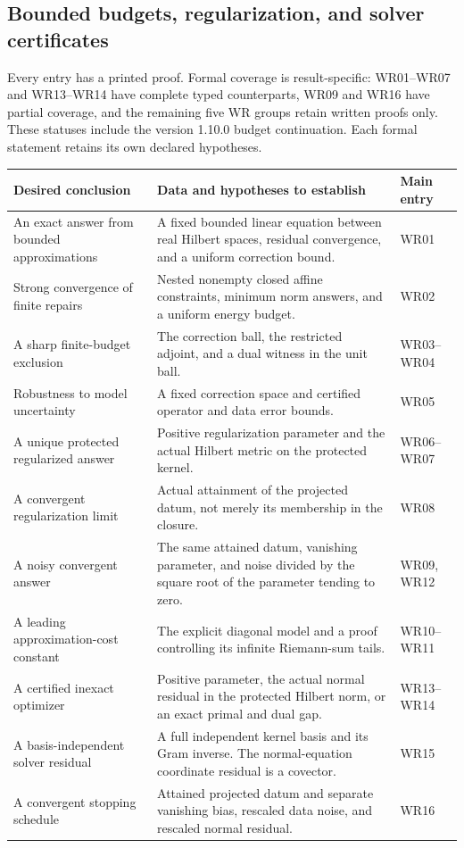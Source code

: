 \subsection{Bounded budgets, regularization, and solver certificates}
Every entry has a printed proof. Formal coverage is result-specific: WR01--WR07 and WR13--WR14 have complete typed counterparts, WR09 and WR16 have partial coverage, and the remaining five WR groups retain written proofs only. These statuses include the version 1.10.0 budget continuation. Each formal statement retains its own declared hypotheses.
\begin{longtable}{@{}p{.24\linewidth}p{.48\linewidth}p{.21\linewidth}@{}}
\toprule Desired conclusion & Data and hypotheses to establish & Main entry\\\midrule\endhead
An exact answer from bounded approximations & A fixed bounded linear equation between real Hilbert spaces, residual convergence, and a uniform correction bound. & WR01\\[4pt]
Strong convergence of finite repairs & Nested nonempty closed affine constraints, minimum norm answers, and a uniform energy budget. & WR02\\[4pt]
A sharp finite-budget exclusion & The correction ball, the restricted adjoint, and a dual witness in the unit ball. & WR03--WR04\\[4pt]
Robustness to model uncertainty & A fixed correction space and certified operator and data error bounds. & WR05\\[4pt]
A unique protected regularized answer & Positive regularization parameter and the actual Hilbert metric on the protected kernel. & WR06--WR07\\[4pt]
A convergent regularization limit & Actual attainment of the projected datum, not merely its membership in the closure. & WR08\\[4pt]
A noisy convergent answer & The same attained datum, vanishing parameter, and noise divided by the square root of the parameter tending to zero. & WR09, WR12\\[4pt]
A leading approximation-cost constant & The explicit diagonal model and a proof controlling its infinite Riemann-sum tails. & WR10--WR11\\[4pt]
A certified inexact optimizer & Positive parameter, the actual normal residual in the protected Hilbert norm, or an exact primal and dual gap. & WR13--WR14\\[4pt]
A basis-independent solver residual & A full independent kernel basis and its Gram inverse. The normal-equation coordinate residual is a covector. & WR15\\[4pt]
A convergent stopping schedule & Attained projected datum and separate vanishing bias, rescaled data noise, and rescaled normal residual. & WR16\\\bottomrule
\end{longtable}

